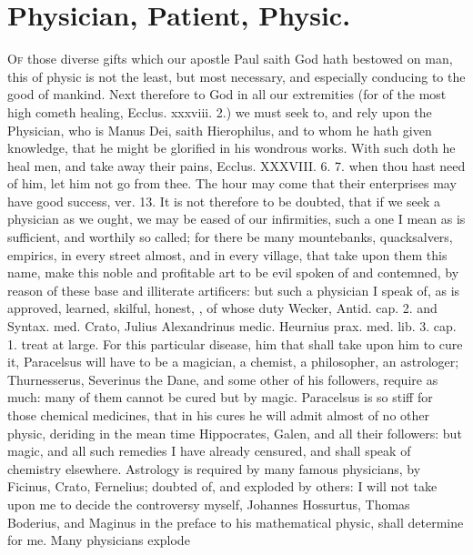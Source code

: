 {%

\section{Physician, Patient, Physic.}

\lettrine{O}{f} those diverse gifts which our apostle Paul saith God hath bestowed
on man, this of physic is not the least, but most necessary, and
especially conducing to the good of mankind. Next therefore to God in
all our extremities (for of the most high cometh healing, Ecclus.
xxxviii. 2.) we must seek to, and rely upon the Physician, who is
Manus Dei, saith Hierophilus, and to whom he hath given knowledge, that
he might be glorified in his wondrous works. With such doth he heal
men, and take away their pains, Ecclus. XXXVIII. 6. 7. when thou hast
need of him, let him not go from thee. The hour may come that their
enterprises may have good success, ver. 13. It is not therefore to be
doubted, that if we seek a physician as we ought, we may be eased of
our infirmities, such a one I mean as is sufficient, and worthily so
called; for there be many mountebanks, quacksalvers, empirics, in every
street almost, and in every village, that take upon them this name,
make this noble and profitable art to be evil spoken of and contemned,
by reason of these base and illiterate artificers: but such a physician
I speak of, as is approved, learned, skilful, honest, \etc{}, of whose
duty Wecker, Antid. cap. 2. and Syntax. med. Crato, Julius Alexandrinus
medic. Heurnius prax. med. lib. 3. cap. 1. \etc{} treat at large. For this
particular disease, him that shall take upon him to cure it,
Paracelsus will have to be a magician, a chemist, a philosopher,
an astrologer; Thurnesserus, Severinus the Dane, and some other of his
followers, require as much: many of them cannot be cured but by magic.
Paracelsus is so stiff for those chemical medicines, that in his
cures he will admit almost of no other physic, deriding in the mean
time Hippocrates, Galen, and all their followers: but magic, and all
such remedies I have already censured, and shall speak of chemistry
elsewhere. Astrology is required by many famous physicians, by
Ficinus, Crato, Fernelius; doubted of, and exploded by others: I
will not take upon me to decide the controversy myself, Johannes
Hossurtus, Thomas Boderius, and Maginus in the preface to his
mathematical physic, shall determine for me. Many physicians explode
}

